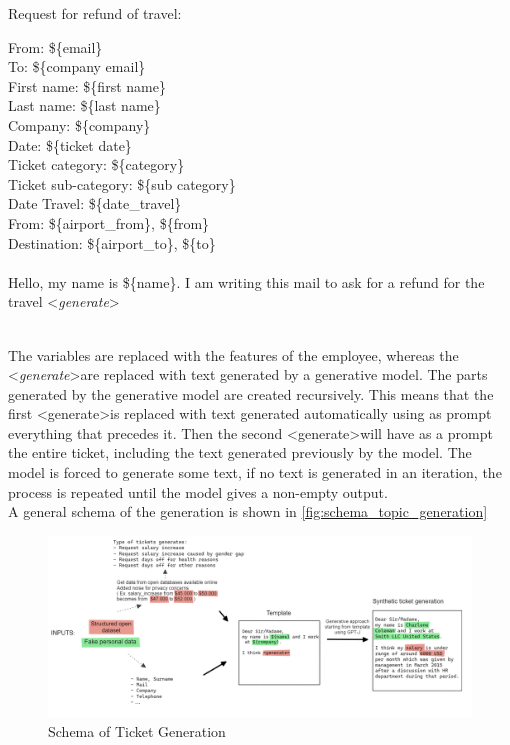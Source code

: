 Request for refund of travel:
\begin{adjustwidth}{1cm}{}
From: \$\{email\} \\
To: \$\{company email\} \\
First name: \$\{first name\}\\
Last name: \$\{last name\}\\
Company: \$\{company\}\\
Date: \$\{ticket date\}\\
Ticket category: \$\{category\}\\
Ticket sub-category: \$\{sub category\} \\
Date Travel: \$\{date\_travel\} \\
From: \$\{airport\_from\}, \$\{from\} \\
Destination: \$\{airport\_to\}, \$\{to\} \\
\\
Hello, my name is \$\{name\}. I am writing this mail to ask for a refund for the travel \textless \textit{generate}\textgreater \\ \\

\end{adjustwidth}
        
The variables are replaced with the features of the employee, whereas the \textless \textit{generate}\textgreater \space are replaced with text generated by a generative model. The parts generated by the generative model are created recursively. This means that the first \textless generate\textgreater \space is replaced with text generated automatically using as prompt everything that precedes it. Then the second \textless generate\textgreater \space will have as a prompt the entire ticket, including the text generated previously by the model. The model is forced to generate some text, if no text is generated in an iteration, the process is repeated until the model gives a non-empty output. \\
A general schema of the generation is shown in \autoref{fig:schema_topic_generation}

\begin{figure}[h] 
    \includegraphics[width=\textwidth]{images/ticket_creation_schema.png}
    \caption{Schema of Ticket Generation}
    \label{fig:schema_topic_generation}
\end{figure}    


